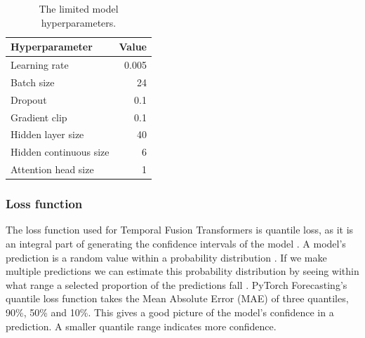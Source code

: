         \begin{table}[ht!]
        \begin{center}
        \caption{The limited model hyperparameters.
        \label{tab:lim_params}}
        \vspace{0.5cm}
        \begin{tabular}{|l|r|}
        \hline
        \textbf{Hyperparameter} & \textbf{Value} \\ \hline
        Learning rate            & 0.005         \\ \hline
        Batch size              & 24            \\ \hline
        Dropout                 & 0.1            \\ \hline
        Gradient clip           & 0.1           \\ \hline
        Hidden layer size            & 40         \\ \hline
        Hidden continuous size & 6         \\ \hline
        Attention head size    & 1         \\ \hline
        \end{tabular}
        
        \end{center}
        \end{table}
    
    \pagebreak
    \subsubsection{Loss function}\label{sec:loss_function}
    The loss function used for Temporal Fusion Transformers is quantile loss, as it is an integral part of generating the confidence intervals of the model \cite{lim_temporal_2020}.
    A model's prediction is a random value within a probability distribution \cite{wen_multi-horizon_2018}. If we make multiple predictions we can estimate this probability distribution by seeing within what range a selected proportion of the predictions fall \cite{koenker_quantile_2001}. PyTorch Forecasting's quantile loss function takes the Mean Absolute Error (MAE) of three quantiles, 90\%, 50\% and 10\%. This gives a good picture of the model's confidence in a prediction. A smaller quantile range indicates more confidence. 
    
    
    